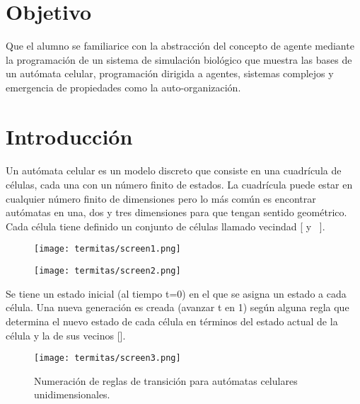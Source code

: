 

\section{Objetivo}
Que el alumno se familiarice con la abstracción del concepto de agente mediante la programación de un sistema de simulación biológico que muestra las bases de un autómata celular, programación dirigida a agentes, sistemas complejos y emergencia de propiedades como la auto-organización.\par

\section{Introducci\'on}
\paragraph*{}
Un autómata celular es un modelo discreto que consiste en una cuadrícula de células, cada una con un número finito de estados. La cuadrícula puede estar en cualquier número finito de dimensiones pero lo más común es encontrar autómatas en una, dos y tres dimensiones para que tengan sentido geométrico. Cada célula tiene definido un conjunto de células llamado vecindad [ y ~].


\begin{figure}
  \centering
  \begin{minipage}{.5\textwidth}
    \centering
    \texttt{[image: termitas/screen1.png]}
    \label{fig:vecindadmoore}
  \end{minipage}%
  \begin{minipage}{.5\textwidth}
    \centering
    \texttt{[image: termitas/screen2.png]}
    \label{fig:vecindadneumann}
  \end{minipage}
\end{figure}

Se tiene un estado inicial (al tiempo t=0) en el que se asigna un estado a cada célula. Una nueva generación es creada (avanzar t en 1) según alguna regla que determina el nuevo estado de cada célula en términos del estado actual de la célula y la de sus vecinos [].

\begin{figure}
  \centering
  \texttt{[image: termitas/screen3.png]}
  \caption{Numeración de reglas de transición para autómatas celulares unidimensionales.}
  \label{fig:numtrans}
\end{figure}

